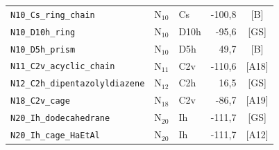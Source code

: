 \begin{longtable}{@{}p{4.6cm}lp{1.4cm}rc@{}}
\texttt{N10\_Cs\_ring\_chain} & N$_{10}$ & Cs & -100{,}8 & [B] \\
\texttt{N10\_D10h\_ring} & N$_{10}$ & D10h & -95{,}6 & [GS] \\
\texttt{N10\_D5h\_prism} & N$_{10}$ & D5h & 49{,}7 & [B] \\
\addlinespace
\texttt{N11\_C2v\_acyclic\_chain} & N$_{11}$ & C2v & -110{,}6 & [A18] \\
\addlinespace
\texttt{N12\_C2h\_dipentazolyldiazene} & N$_{12}$ & C2h & 16{,}5 & [GS] \\
\addlinespace
\texttt{N18\_C2v\_cage} & N$_{18}$ & C2v & -86{,}7 & [A19] \\
\addlinespace
\texttt{N20\_Ih\_dodecahedrane} & N$_{20}$ & Ih & -111{,}7 & [GS] \\
\texttt{N20\_Ih\_cage\_HaEtAl} & N$_{20}$ & Ih & -111{,}7 & [A12] \\
\end{longtable}

